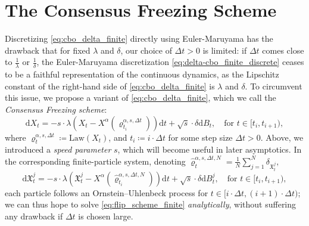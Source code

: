 \documentclass[reqno]{amsart}
\numberwithin{algorithm}{section}
\newcommand{\diff}{\mathrm{d}}
\newcommand{\law}{\mathrm{Law}}
\newcommand{\Xalpha}{{X^\alpha}}
\newcommand{\Xf}{{\mathfrak{X}}}
\begin{document}
{\section{The Consensus Freezing Scheme}\label{sec:CF}
{Discretizing} \cref{eq:cbo_delta_finite} directly using Euler-Maruyama has the drawback that for fixed $\lambda$ and $\delta$, our choice of $\Delta t > 0$ is limited: if $\Delta t$ comes close to $\frac{1}{\lambda}$ or $\frac{1}{\delta}$, the Euler-Maruyama discretization \eqref{eq:delta-cbo_finite_discrete} ceases to be a faithful representation of the continuous dynamics, as the Lipschitz constant of the right-hand side of \eqref{eq:cbo_delta_finite} is $\lambda$ and $\delta$. To circumvent this issue, we propose a variant of \eqref{eq:cbo_delta_finite}, which we call the \emph{Consensus Freezing scheme}:
\begin{equation}\tag{CF}\label{eq:flip_scheme_2}
    \diff X_t = -s\cdot\lambda\left(X_t - \Xalpha(\varrho^{\alpha,s,\Delta t}_{t_i})\right) \diff t + \sqrt{s}\cdot\delta \diff B_t, \quad \text{for } t \in [t_i, t_{i+1}),
\end{equation}
where $\varrho^{\alpha,s,\Delta t}_t \coloneqq \law(X_t)$, and $t_i \coloneqq  i \cdot \Delta t$ for some step size $\Delta t > 0$. Above, we introduced a \emph{speed parameter} $s$, which will become useful in later {asymptotics}. In the corresponding finite-particle system, denoting  $\widehat\varrho^{\alpha,s,\Delta t,N}_t = \frac{1}{N}\sum_{j=1}^N\delta_{\Xf^j_t},$
\begin{equation}\tag{CF$_N$}\label{eq:flip_scheme_finite}
    \diff \Xf^j_t = -s \cdot \lambda(\Xf^j_t - \Xalpha(\widehat\varrho^{\alpha,s,\Delta t,N}_{t_i})) \diff t + \sqrt{s} \cdot \delta \diff B^j_t, \quad \text{for } t \in [t_i, t_{i+1}),
\end{equation}
each particle follows an Ornstein–Uhlenbeck process for $t \in [i\cdot\Delta t, (i+1)\cdot\Delta t)$; we can thus hope to solve \eqref{eq:flip_scheme_finite} \emph{analytically}, {without suffering any drawback if $\Delta t$ is chosen large}.

}
\end{document}
